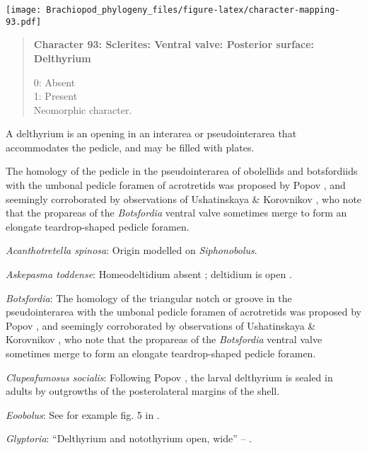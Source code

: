 \documentclass[openany]{book}
\theoremstyle{definition}
\theoremstyle{definition}
\theoremstyle{definition}
\theoremstyle{remark}
\begin{document}
\texttt{[image: Brachiopod\_phylogeny\_files/figure-latex/character-mapping-93.pdf]}

\begin{quote}
\textbf{Character 93: Sclerites: Ventral valve: Posterior surface:
Delthyrium}

0: Absent\\
1: Present\\
Neomorphic character.
\end{quote}

A delthyrium is an opening in an interarea or pseudointerarea that
accommodates the pedicle, and may be filled with plates.

The homology of the pedicle in the pseudointerarea of obolellids and
botsfordiids with the umbonal pedicle foramen of acrotretids was
proposed by Popov \citeyearpar{Popov1992TheCambrian}, and seemingly
corroborated by observations of Ushatinskaya \& Korovnikov
\citeyearpar{Ushatinskaya2016Revisionof}, who note that the propareas of
the \emph{Botsfordia} ventral valve sometimes merge to form an elongate
teardrop-shaped pedicle foramen.

\hypertarget{Acanthotretella_spinosa-coding-93}{}
\emph{Acanthotretella spinosa}: Origin modelled on \emph{Siphonobolus}.

\hypertarget{Askepasma_toddense-coding-93}{}
\emph{Askepasma toddense}: Homeodeltidium absent
\citep[p.~153]{Williams2000LinguliformeaCraniiformea}; deltidium is open
\citep[see][fig. 4]{Topper2013Theoldest}.

\hypertarget{Botsfordia-coding-93}{}
\emph{Botsfordia}: The homology of the triangular notch or groove in the
pseudointerarea with the umbonal pedicle foramen of acrotretids was
proposed by Popov \citeyearpar{Popov1992TheCambrian}, and seemingly
corroborated by observations of Ushatinskaya \& Korovnikov
\citeyearpar{Ushatinskaya2016Revisionof}, who note that the propareas of
the \emph{Botsfordia} ventral valve sometimes merge to form an elongate
teardrop-shaped pedicle foramen.

\hypertarget{Clupeafumosus_socialis-coding-93}{}
\emph{Clupeafumosus socialis}: Following Popov
\citeyearpar{Popov1992TheCambrian}, the larval delthyrium is sealed in
adults by outgrowths of the posterolateral margins of the shell.

\hypertarget{Eoobolus-coding-93}{}
\emph{Eoobolus}: See for example fig. 5 in
\citet{Balthasar2009Thebrachiopod}.

\hypertarget{Glyptoria-coding-93}{}
\emph{Glyptoria}: ``Delthyrium and notothyrium open, wide'' --
\citet{Cooper1976LowerCambrian}.
\end{document}
